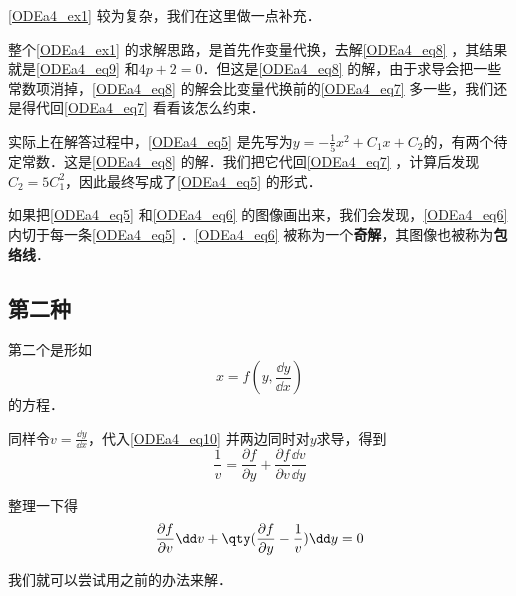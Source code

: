 \autoref{ODEa4_ex1} 较为复杂，我们在这里做一点补充．

整个\autoref{ODEa4_ex1} 的求解思路，是首先作变量代换，去解\autoref{ODEa4_eq8} ，其结果就是\autoref{ODEa4_eq9} 和$4p+2=0$．但这是\autoref{ODEa4_eq8} 的解，由于求导会把一些常数项消掉，\autoref{ODEa4_eq8} 的解会比变量代换前的\autoref{ODEa4_eq7} 多一些，我们还是得代回\autoref{ODEa4_eq7} 看看该怎么约束．

实际上在解答过程中，\autoref{ODEa4_eq5} 是先写为$y=-\frac{1}{5}x^2+C_1x+C_2$的，有两个待定常数．这是\autoref{ODEa4_eq8} 的解．我们把它代回\autoref{ODEa4_eq7} ，计算后发现$C_2=5C_1^2$，因此最终写成了\autoref{ODEa4_eq5} 的形式．

如果把\autoref{ODEa4_eq5} 和\autoref{ODEa4_eq6} 的图像画出来，我们会发现，\autoref{ODEa4_eq6} 内切于每一条\autoref{ODEa4_eq5} 
．\autoref{ODEa4_eq6} 被称为一个\textbf{奇解}，其图像也被称为\textbf{包络线}．

\subsection{第二种}

第二个是形如
\begin{equation}\label{ODEa4_eq10}
x=f(y, \frac{\dd y}{\dd x})
\end{equation}
的方程．

同样令$v=\frac{\dd y}{\dd x}$，代入\autoref{ODEa4_eq10} 并两边同时对$y$求导，得到
\begin{equation}
\frac{1}{v}=\frac{\partial f}{\partial y}+\frac{\partial f}{\partial v}\frac{\dd v}{\dd y}
\end{equation}

整理一下得
\begin{equation}
\frac{\partial f}{\partial v}\dd v +\qty(\frac{\partial f}{\partial y}-\frac{1}{v})\dd y=0
\end{equation}

我们就可以尝试用之前的办法来解．

\begin{example}{}

\end{example}




















